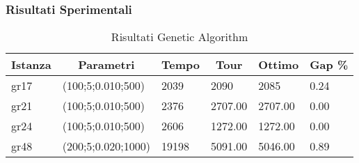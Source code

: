 \subsubsection{Risultati Sperimentali}

\begin{table}
  \caption{Risultati Genetic Algorithm}\label{tab:}
  \begin{center}
    \begin{tabular}[c]{l|l|l|l|l|l|}
      \hline
      \multicolumn{1}{c|}{\textbf{Istanza}} & 
      \multicolumn{1}{c|}{\textbf{Parametri}} &
      \multicolumn{1}{c|}{\textbf{Tempo}} &
      \multicolumn{1}{c|}{\textbf{Tour}} &
      \multicolumn{1}{c}{\textbf{Ottimo}} &
      \multicolumn{1}{c}{\textbf{Gap \%}}
      \\
      \hline
      gr17 & (100;5;0.010;500) & 2039 & 2090 & 2085 & 0.24 \\
      gr21&(100;5;0.010;500)&2376&2707.00&2707.00&0.00 \\
      gr24&(100;5;0.010;500)&2606&1272.00&1272.00&0.00\\
      gr48&(200;5;0.020;1000)&19198&5091.00&5046.00&0.89\\
      
      \hline
    \end{tabular}
  \end{center}
\end{table}

